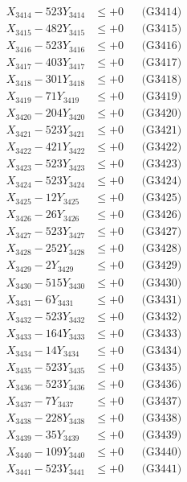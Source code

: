 \documentclass[a4paper,10pt]{article}
\begin{document}
{\begin{align}
X_{3414} - 523Y_{3414} &\leq +0 && \text{(G3414)} \\
X_{3415} - 482Y_{3415} &\leq +0 && \text{(G3415)} \\
X_{3416} - 523Y_{3416} &\leq +0 && \text{(G3416)} \\
X_{3417} - 403Y_{3417} &\leq +0 && \text{(G3417)} \\
X_{3418} - 301Y_{3418} &\leq +0 && \text{(G3418)} \\
X_{3419} - 71Y_{3419} &\leq +0 && \text{(G3419)} \\
X_{3420} - 204Y_{3420} &\leq +0 && \text{(G3420)} \\
\allowbreak
X_{3421} - 523Y_{3421} &\leq +0 && \text{(G3421)} \\
X_{3422} - 421Y_{3422} &\leq +0 && \text{(G3422)} \\
X_{3423} - 523Y_{3423} &\leq +0 && \text{(G3423)} \\
X_{3424} - 523Y_{3424} &\leq +0 && \text{(G3424)} \\
X_{3425} - 12Y_{3425} &\leq +0 && \text{(G3425)} \\
X_{3426} - 26Y_{3426} &\leq +0 && \text{(G3426)} \\
X_{3427} - 523Y_{3427} &\leq +0 && \text{(G3427)} \\
X_{3428} - 252Y_{3428} &\leq +0 && \text{(G3428)} \\
X_{3429} - 2Y_{3429} &\leq +0 && \text{(G3429)} \\
X_{3430} - 515Y_{3430} &\leq +0 && \text{(G3430)} \\
\allowbreak
X_{3431} - 6Y_{3431} &\leq +0 && \text{(G3431)} \\
X_{3432} - 523Y_{3432} &\leq +0 && \text{(G3432)} \\
X_{3433} - 164Y_{3433} &\leq +0 && \text{(G3433)} \\
X_{3434} - 14Y_{3434} &\leq +0 && \text{(G3434)} \\
X_{3435} - 523Y_{3435} &\leq +0 && \text{(G3435)} \\
X_{3436} - 523Y_{3436} &\leq +0 && \text{(G3436)} \\
X_{3437} - 7Y_{3437} &\leq +0 && \text{(G3437)} \\
X_{3438} - 228Y_{3438} &\leq +0 && \text{(G3438)} \\
X_{3439} - 35Y_{3439} &\leq +0 && \text{(G3439)} \\
X_{3440} - 109Y_{3440} &\leq +0 && \text{(G3440)} \\
\allowbreak
X_{3441} - 523Y_{3441} &\leq +0 && \text{(G3441)} \\

\end{align}}
\end{document}
